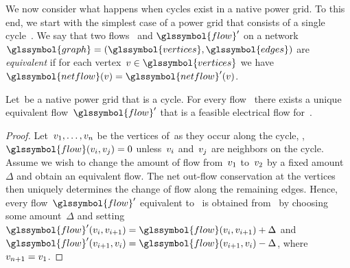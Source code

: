 We now consider what happens when cycles exist in a native power grid.  To this
end, we start with the simplest case of a power grid that consists of a single
cycle~\connectedComponent.  We say that two flows~ and
$\glssymbol{flow}'$ on a network~$\glssymbol{graph} = (\glssymbol{vertices},
\glssymbol{edges})$ are \emph{equivalent} if for each vertex~$\vertex \in
\glssymbol{vertices}$ we have~$\glssymbol{netflow}(\vertex) =
\glssymbol{netflow}'(\vertex)$.
%
\begin{lemma}
  Let~\connectedComponent be a native power grid that is a cycle.  For every
  flow~ there exists a unique equivalent
  flow~$\glssymbol{flow}'$ that is a feasible electrical flow
  for~\connectedComponent.
  \label{ch:facts:lem:cycle-equivalent-flow}
\end{lemma}
%
\begin{proof}
  Let~$v_1,\dots,v_n$ be the vertices of~\connectedComponent as they
  occur along the cycle, \ie, $\glssymbol{flow}(\vertex_i,\vertex_j)= 0$
  unless~$v_i$ and~$v_j$ are neighbors on the cycle.
  Assume we wish to change the amount of flow from~$v_1$ to~$v_2$ by
  a fixed amount~$\Delta$ and obtain an equivalent flow.  The net out-flow
  conservation at the vertices then uniquely determines the change of flow along
  the remaining edges. Hence, every flow~$\glssymbol{flow}'$ equivalent
  to~ is obtained from~ by choosing some
  amount~$\Delta$ and setting~$\glssymbol{flow}'(\vertex_i,\vertex_{i+1}) =
  \glssymbol{flow}(\vertex_i, \vertex_{i+1}) + \Delta$ and~$\glssymbol{flow}'(\vertex_{i+1},
  \vertex_i) = \glssymbol{flow} ( \vertex_{i+1}, \vertex_i) -
  \Delta$, where~$v_{n+1} = v_1$.


\end{proof}
